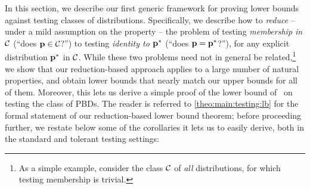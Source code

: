 In this section, we describe our first generic framework for proving lower bounds against testing classes of distributions. Specifically, we describe how to \emph{reduce} -- under a mild assumption on the property \class{} -- the problem of testing \emph{membership in $\mathcal{C}$} (``does $\mathbf{p}\in\mathcal{C}$?'') to testing \emph{identity to $\mathbf{p}^\ast$} (``does $\mathbf{p}=\mathbf{p}^\ast$?''), for any explicit distribution $\mathbf{p}^\ast$ in $\mathcal{C}$. While these two problems need not in general be related,\footnote{As a simple example, consider the class $\mathcal{C}$ of \emph{all} distributions, for which testing membership is trivial.} we show that our reduction-based approach applies to a large number of natural properties, and obtain lower bounds that nearly match our upper bounds for all of them. Moreover, this lets us derive a simple proof of the lower bound of~\cite{AD:15} on testing the class of PBDs.
The reader is referred to \cref{theo:main:testing:lb} for the formal statement of our reduction-based lower bound theorem; before proceeding further, we restate below some of the corollaries it lets us to easily derive, both in the standard and tolerant testing settings:

\corolbsqrtn*
\corolbpbd*
\corolbksiirv*
\corolbtolnlogn*
\corolbtolpbd*

